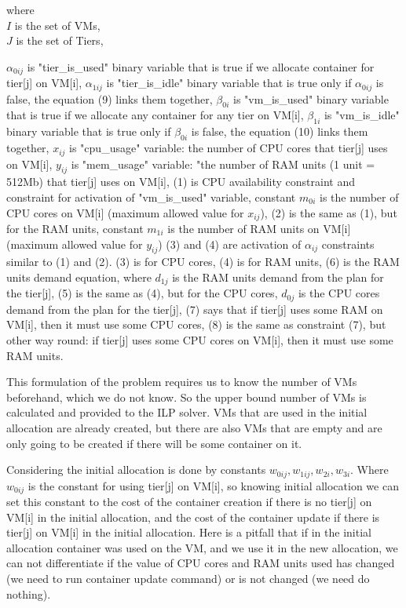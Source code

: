 where \\
\indent $I$ is the set of VMs,\\
\indent $J$ is the set of Tiers,
\begin{sloppypar} $\alpha_{0ij}$ is "tier\_is\_used" binary variable that is true if we allocate container for tier[j] on VM[i],
\indent $\alpha_{1ij}$ is "tier\_is\_idle" binary variable that is true only if $\alpha_{0ij}$ is false, the equation (9) links them together,
\indent $\beta_{0i}$ is "vm\_is\_used" binary variable that is true if we allocate any container for any tier on VM[i],
\indent $\beta_{1i}$ is "vm\_is\_idle" binary variable that is true only if $\beta_{0i}$ is false, the equation (10) links them together,
\indent $x_{ij}$ is "cpu\_usage" variable: the number of CPU cores that tier[j] uses on VM[i],
\indent $y_{ij}$ is "mem\_usage" variable: "the number of RAM units (1 unit = 512Mb) that tier[j] uses on VM[i],
\indent (1) is CPU availability constraint and constraint for activation of "vm\_is\_used" variable, constant $m_{0i}$ is the number of CPU cores on VM[i] (maximum allowed value for $x_{ij}$),
\indent (2) is the same as (1), but for the RAM units, constant $m_{1i}$ is the number of RAM units on VM[i] (maximum allowed value for $y_{ij}$) 
\indent (3) and (4) are activation of $\alpha_{ij}$ constraints similar to (1) and (2). (3) is for CPU cores, (4) is for RAM units,
\indent (6) is the RAM units demand equation, where $d_{1j}$ is the RAM units demand from the plan for the tier[j],
\indent (5) is the same as (4), but for the CPU cores, $d_{0j}$ is the CPU cores demand from the plan for the tier[j],
\indent (7) says that if tier[j] uses some RAM on VM[i], then it must use some CPU cores,
\indent (8) is the same as constraint (7), but other way round: if tier[j] uses some CPU cores on VM[i], then it must use some RAM units.
\end{sloppypar}

This formulation of the problem requires us to know the number of VMs beforehand, which we do not know. So the upper bound number of VMs is calculated and provided to the ILP solver. VMs that are used in the initial allocation are already created, but there are also VMs that are empty and are only going to be created if there will be some container on it.

Considering the initial allocation is done by constants $w_{0ij}, w_{1ij}, w_{2i}, w_{3i}$.
Where $w_{0ij}$ is the constant for using tier[j] on VM[i], so knowing initial allocation we can set this constant to the cost of the container creation if there is no tier[j] on VM[i] in the initial allocation, and the cost of the container update if there is tier[j] on VM[i] in the initial allocation. Here is a pitfall that if in the initial allocation container was used on the VM, and we use it in the new allocation, we can not differentiate if the value of CPU cores and RAM units used has changed (we need to run container update command) or is not changed (we need do nothing).

